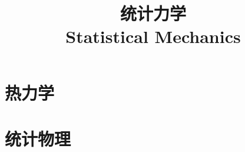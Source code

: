 \documentclass{../thunote}
\begin{document}
\title{统计力学\\Statistical Mechanics}
\maketitle

\frontmatter
\tableofcontents
\listoffigures

\mainmatter

\part{热力学}




\part{统计物理}





\end{document}
